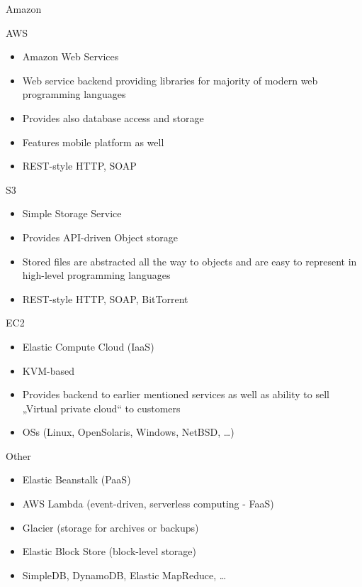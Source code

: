 \documentclass[presentation]{beamer}
\begin{document}
\begin{frame}[label={sec:org75e9755}]{Amazon}
\begin{block}{AWS}
\begin{itemize}
\item Amazon Web Services
\item Web service backend providing libraries for majority of modern web programming languages
\item Provides also database access and storage
\item Features mobile platform as well
\item REST-style HTTP, SOAP
\end{itemize}
\end{block}

\begin{block}{S3}
\begin{itemize}
\item Simple Storage Service
\item Provides API-driven Object storage
\item Stored files are abstracted all the way to objects and are easy to
represent in high-level programming languages
\item REST-style HTTP, SOAP, BitTorrent
\end{itemize}
\end{block}

\begin{block}{EC2}
\begin{itemize}
\item Elastic Compute Cloud (IaaS)
\item KVM-based
\item Provides backend to earlier mentioned services as well as ability to
sell „Virtual private cloud“ to customers
\item OSs (Linux, OpenSolaris, Windows, NetBSD, \ldots{})
\end{itemize}
\end{block}

\begin{block}{Other}
\begin{itemize}
\item Elastic Beanstalk (PaaS)
\item AWS Lambda (event-driven, serverless computing - FaaS)
\item Glacier (storage for archives or backups)
\item Elastic Block Store (block-level storage)
\item SimpleDB, DynamoDB, Elastic MapReduce, \ldots{}
\end{itemize}
\end{block}
\end{frame}
\end{document}

